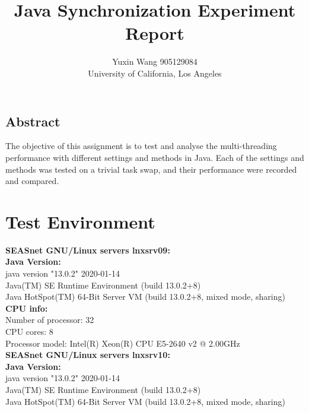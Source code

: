 \documentclass[letterpaper,twocolumn,10pt]{article}
\begin{document}
\date{}

\title{\Large \bf Java Synchronization Experiment Report}

\author{
{\rm Yuxin Wang  905129084}\\
University of California, Los Angeles}

\maketitle

\thispagestyle{empty}


\subsection*{Abstract}
The objective of this assignment is to test and analyse the multi-threading performance with different settings and methods in Java. Each of the settings and methods was tested on a trivial task swap, and their performance were recorded and compared.
\section{Test Environment}


\textbf{SEASnet GNU/Linux servers lnxsrv09:}\\

\noindent
\textbf{Java Version:} \\
java version "13.0.2" 2020-01-14\\
Java(TM) SE Runtime Environment (build 13.0.2+8)\\
Java HotSpot(TM) 64-Bit Server VM (build 13.0.2+8, mixed mode, sharing)\\

\noindent
\textbf{CPU info:}\\
Number of processor: 32\\
CPU cores: 8\\
Processor model: Intel(R) Xeon(R) CPU E5-2640 v2 @ 2.00GHz\\

\noindent
\textbf{SEASnet GNU/Linux servers lnxsrv10:}\\

\noindent
\textbf{Java Version:} \\
java version "13.0.2" 2020-01-14\\
Java(TM) SE Runtime Environment (build 13.0.2+8)\\
Java HotSpot(TM) 64-Bit Server VM (build 13.0.2+8, mixed mode, sharing)\\
\end{document}

